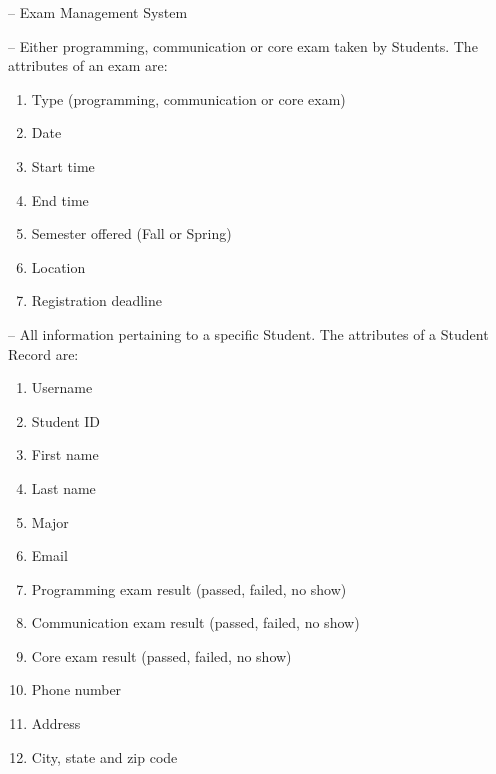 
\begin{description}
   \label{def:record}
   \label{def:exam} 
   \item[1. EMS] -- Exam Management System 
   \item[2. Exams] --  Either programming,
      communication or core exam taken by Students. The attributes of an exam
      are:
      \begin{enumerate}
         \item Type (programming, communication or core exam)
         \item Date
         \item Start time
         \item End time
         \item Semester offered (Fall or Spring)
         \item Location
         \item Registration deadline
      \end{enumerate}
   \item[3. Student record] --  All
      information pertaining to a specific Student. The attributes of a Student
      Record are:
      \begin{enumerate}
         \item Username
         \item Student ID
         \item First name
         \item Last name
         \item Major
         \item Email
         \item Programming exam result (passed, failed, no show)
         \item Communication exam result (passed, failed, no show)
         \item Core exam result (passed, failed, no show)
         \item Phone number
         \item Address
         \item City, state and zip code
      \end{enumerate}
\end{description}

